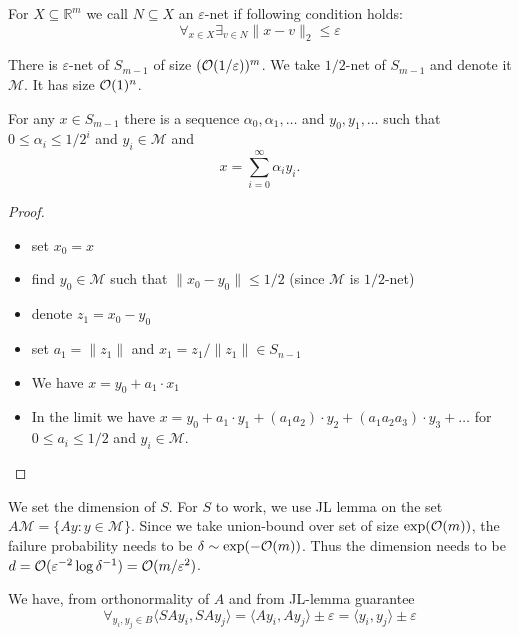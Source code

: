 \documentclass[11pt]{article}
\begin{document}
\begin{definition}[\cite{10.5555/581165}]
For $X \subseteq \mathbb{R}^m$ we call $N \subseteq X$ an $\varepsilon$-net if following condition holds:
$$\forall_{x \in X} \exists_{v \in N} \|x-v\|_2 \le \varepsilon$$
\end{definition}

There is $\varepsilon$-net of $S_{m-1}$ of size $(\mathcal{O}(1/\varepsilon))^m$. We take $1/2$-net of $S_{m-1}$ and denote it $\mathcal{M}$. It has size $\mathcal{O}(1)^n$.

\begin{lemma}
For any $x \in S_{m-1}$ there is a sequence $\alpha_0,\alpha_1,\ldots$ and $y_0,y_1,\ldots$ such that $0 \le \alpha_i \le 1/2^i$ and $y_i \in \mathcal{M}$ and 
$$x = \sum_{i=0}^{\infty} \alpha_i y_i.$$
\end{lemma}
\begin{proof}
\ 
\begin{itemize}
\item set $x_0 = x$ 
\item find $y_0 \in \mathcal{M}$ such that $\| x_0- y_0 \| \le 1/2$ (since $\mathcal{M}$ is $1/2$-net)
\item denote $z_1 = x_0 - y_0$
\item set $a_1 = \|z_1\|$ and $x_1 = z_1/\|z_1\| \in S_{n-1}$
\item We have $x =  y_0 + a_1 \cdot x_1$ 
\item In the limit we have $x = y_0 + a_1 \cdot y_1 + (a_1 a_2) \cdot y_2 + (a_1 a_2 a_3) \cdot y_3 + \ldots$
for $0 \le a_i \le 1/2$ and $y_i \in \mathcal{M}$.
\end{itemize}
\end{proof}

We set the dimension of $S$. For $S$ to work, we use JL lemma on the set $A \mathcal{M} = \{Ay : y \in \mathcal{M}\}$. Since we take union-bound over set of size $\exp(\mathcal{O}(m))$, the failure probability needs to be $\delta \sim \exp(-\mathcal{O}(m))$. Thus the dimension needs to be $d = \mathcal{O}(\varepsilon^{-2} \log \delta^{-1}) = \mathcal{O}(m/\varepsilon^2)$.

We have, from orthonormality of $A$ and from JL-lemma guarantee
$$\forall_{y_i,y_j \in B} \langle SAy_i, SAy_j \rangle = \langle Ay_i, Ay_j \rangle  \pm \varepsilon = \langle y_i, y_j \rangle \pm \varepsilon$$
\end{document}
